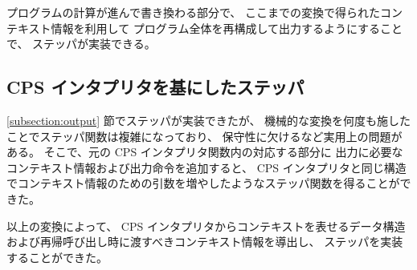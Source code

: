 プログラムの計算が進んで書き換わる部分で、
ここまでの変換で得られたコンテキスト情報を利用して
プログラム全体を再構成して出力するようにすることで、
ステッパが実装できる。

\subsection{CPS インタプリタを基にしたステッパ}
\label{subsection:stepper}

\ref{subsection:output} 節でステッパが実装できたが、
機械的な変換を何度も施したことでステッパ関数は複雑になっており、
保守性に欠けるなど実用上の問題がある。
そこで、元の CPS インタプリタ関数内の対応する部分に
出力に必要なコンテキスト情報および出力命令を追加すると、
CPS インタプリタと同じ構造でコンテキスト情報のための引数を増やしたようなステッパ関数を得ることができた。

以上の変換によって、
CPS インタプリタからコンテキストを表せるデータ構造および再帰呼び出し時に渡すべきコンテキスト情報を導出し、
ステッパを実装することができた。
